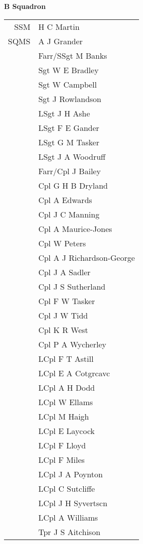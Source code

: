 \begin{center}
  \Large
  \textbf{B Squadron}
\end{center}

\begin{center}
  \begin{tabular}{rl}
    SSM & H C Martin \\
    SQMS & A J Grander \\
    & Farr/SSgt M Banks \\
    & Sgt W E Bradley \\
    & Sgt W Campbell \\
    & Sgt J Rowlandson \\
    & LSgt J H Ashe \\
    & LSgt F E Gander \\
    & LSgt G M Tasker \\
    & LSgt J A Woodruff \\
    & Farr/Cpl J Bailey \\
    & Cpl G H B Dryland \\
    & Cpl A Edwards \\
    & Cpl J C Manning \\
    & Cpl A Maurice-Jones \\
    & Cpl W Peters \\
    & Cpl A J Richardson-George \\
    & Cpl J A Sadler \\
    & Cpl J S Sutherland \\
    & Cpl F W Tasker \\
    & Cpl J W Tidd \\
    & Cpl K R West \\
    & Cpl P A Wycherley \\
    & LCpl F T Astill \\
    & LCpl E A Cotgrcavc \\
    & LCpl A H Dodd \\
    & LCpl W Ellams \\
    & LCpl M Haigh \\
    & LCpl E Laycock \\
    & LCpl F Lloyd \\
    & LCpl F Miles \\
    & LCpl J A Poynton \\
    & LCpl C Sutcliffe \\
    & LCpl J H Syvertscn \\
    & LCpl A Williams \\
    & Tpr J S Aitchison \\

\end{tabular}
\end{center}
